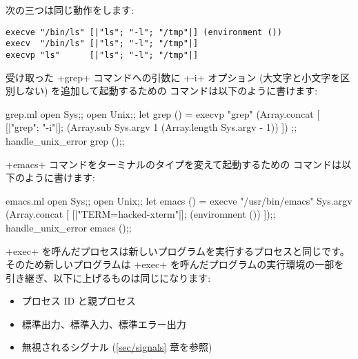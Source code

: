 \begin{example}
次の三つは同じ動作をします:
\begin{lstlisting}
execve "/bin/ls" [|"ls"; "-l"; "/tmp"|] (environment ())
execv  "/bin/ls" [|"ls"; "-l"; "/tmp"|]
execvp "ls"      [|"ls"; "-l"; "/tmp"|]
\end{lstlisting}
\end{example}

\begin{example}
受け取った \ml+grep+ コマンドへの引数に \ml+-i+ オプション (大文字と小文字を区別しない) を追加して起動するための  コマンドは以下のように書けます:
%
\begin{listingcodefile}{grep.ml}
open Sys;;
open Unix;;
let grep () =
 execvp "grep"
   (Array.concat
      [ [|"grep"; "-i"|];
        (Array.sub Sys.argv 1 (Array.length Sys.argv - 1)) ])
;;
handle_unix_error grep ();;
\end{listingcodefile}
\end{example}

\begin{example}
\ml+emacs+ コマンドをターミナルのタイプを変えて起動するための  コマンドは以下のように書けます:
%
\begin{listingcodefile}{emacs.ml}
open Sys;;
open Unix;;
let emacs () =
 execve "/usr/bin/emacs" Sys.argv
   (Array.concat [ [|"TERM=hacked-xterm"|]; (environment ()) ]);;
handle_unix_error emacs ();;
\end{listingcodefile}
\end{example}

\ml+exec+ を呼んだプロセスは新しいプログラムを実行するプロセスと同じです。そのため新しいプログラムは \ml+exec+ を呼んだプログラムの実行環境の一部を引き継ぎ、以下に上げるものは同じになります:
\begin{itemize}
  \item プロセス ID と親プロセス
  \item 標準出力、標準入力、標準エラー出力
  \item 無視されるシグナル (\ref{sec/signals} 章を参照)
\end{itemize}

